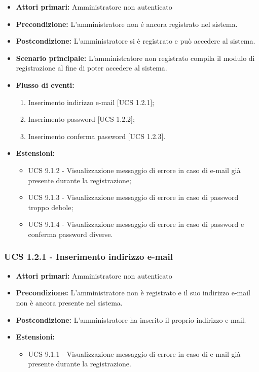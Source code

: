 \begin{itemize}
\item \textbf{Attori primari:} Amministratore non autenticato
\item \textbf{Precondizione:} L'amministratore non é ancora registrato nel sistema.
\item \textbf{Postcondizione:} L'amministratore si è registrato e può accedere al sistema.
\item \textbf{Scenario principale:} L'amministratore non registrato compila il modulo di registrazione al fine di poter accedere al sistema.
\item \textbf{Flusso di eventi:} %
  \begin{enumerate}
        \item Inserimento indirizzo e-mail [UCS 1.2.1];
        \item Inserimento password [UCS 1.2.2];
        \item Inserimento conferma password [UCS 1.2.3].
    \end{enumerate}
\item \textbf{Estensioni:}
	\begin{itemize}
		\item UCS 9.1.2 - Visualizzazione messaggio di errore in caso di e-mail già presente durante la registrazione;
		\item UCS 9.1.3 - Visualizzazione messaggio di errore in caso di password troppo debole;
		\item UCS 9.1.4 - Visualizzazione messaggio di errore in caso di password e conferma password diverse. 
	\end{itemize}
\end{itemize}

\subsubsection{UCS 1.2.1 - Inserimento indirizzo e-mail}%

\begin{itemize}
\item \textbf{Attori primari:} Amministratore non autenticato
\item \textbf{Precondizione:} L'amministratore non è registrato e il suo indirizzo e-mail non è ancora presente nel sistema.
\item \textbf{Postcondizione:} L'amministratore ha inserito il proprio indirizzo e-mail.
\item \textbf{Estensioni:}
	\begin{itemize}
		\item UCS 9.1.1 - Visualizzazione messaggio di errore in caso di e-mail già presente durante la registrazione.
	\end{itemize}
\end{itemize}

